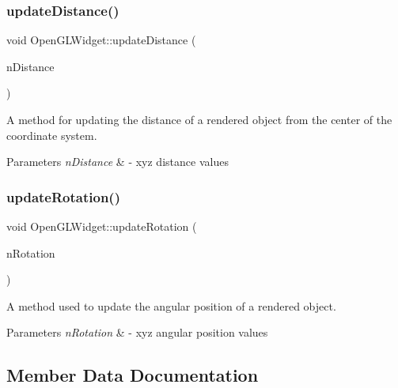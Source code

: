 \subsubsection{\texorpdfstring{update\+Distance()}{updateDistance()}}
{\footnotesize\ttfamily void Open\+G\+L\+Widget\+::update\+Distance (\begin{DoxyParamCaption}\item[{const Q\+Vector$<$ double $>$}]{n\+Distance }\end{DoxyParamCaption})}



A method for updating the distance of a rendered object from the center of the coordinate system. 


\begin{DoxyParams}{Parameters}
{\em n\+Distance} & -\/ xyz distance values \\
\hline
\end{DoxyParams}
\mbox{\label{class_open_g_l_widget_a7082dfc8237267697116a5fc03bd9a1e}} 
\subsubsection{\texorpdfstring{update\+Rotation()}{updateRotation()}}
{\footnotesize\ttfamily void Open\+G\+L\+Widget\+::update\+Rotation (\begin{DoxyParamCaption}\item[{const Q\+Vector$<$ double $>$}]{n\+Rotation }\end{DoxyParamCaption})}



A method used to update the angular position of a rendered object. 


\begin{DoxyParams}{Parameters}
{\em n\+Rotation} & -\/ xyz angular position values \\
\hline
\end{DoxyParams}


\subsection{Member Data Documentation}
\mbox{\label{class_open_g_l_widget_a281ac75f22a1b4ca526be0768447fa8c}} 
